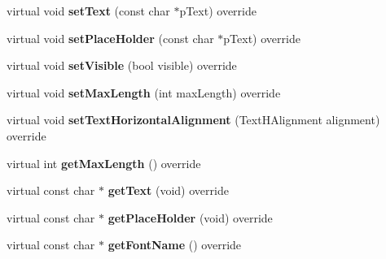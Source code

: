 \begin{DoxyCompactItemize}
\item 
\mbox{\label{classui_1_1EditBoxImplCommon_a62d41befa9ba25ac762fc6770184cffb}} 
virtual void {\bfseries set\+Text} (const char $\ast$p\+Text) override
\item 
\mbox{\label{classui_1_1EditBoxImplCommon_a146be43c3479549a47a8fd0af30ca597}} 
virtual void {\bfseries set\+Place\+Holder} (const char $\ast$p\+Text) override
\item 
\mbox{\label{classui_1_1EditBoxImplCommon_af2ea872bf89f654052c091d64a4ac1ea}} 
virtual void {\bfseries set\+Visible} (bool visible) override
\item 
\mbox{\label{classui_1_1EditBoxImplCommon_a6f55aef5256b818afd87ff8d55480cf5}} 
virtual void {\bfseries set\+Max\+Length} (int max\+Length) override
\item 
\mbox{\label{classui_1_1EditBoxImplCommon_aca3514d070ed0382c68710e7c4f58f06}} 
virtual void {\bfseries set\+Text\+Horizontal\+Alignment} (Text\+H\+Alignment alignment) override
\item 
\mbox{\label{classui_1_1EditBoxImplCommon_a417eaf79677ed821ac7b77a982f6c8c2}} 
virtual int {\bfseries get\+Max\+Length} () override
\item 
\mbox{\label{classui_1_1EditBoxImplCommon_a3c628f737dc18fb36284ab28283fb029}} 
virtual const char $\ast$ {\bfseries get\+Text} (void) override
\item 
\mbox{\label{classui_1_1EditBoxImplCommon_acf09dbb487cdbe80961e78666aacbe48}} 
virtual const char $\ast$ {\bfseries get\+Place\+Holder} (void) override
\item 
\mbox{\label{classui_1_1EditBoxImplCommon_a7faed89e3102df06742be12a79361297}} 
virtual const char $\ast$ {\bfseries get\+Font\+Name} () override
\item 
\mbox{\label{classui_1_1EditBoxImplCommon_aaf1bd06d21e55c695b736f46a753e9fd}} 

\end{DoxyCompactItemize}
